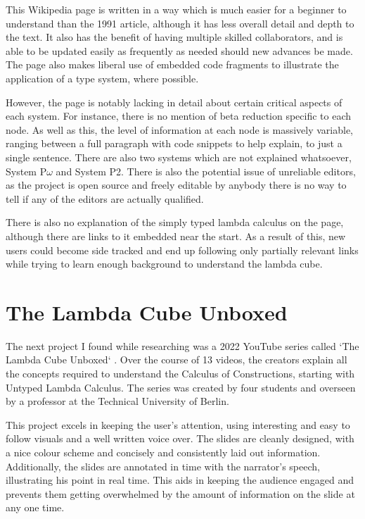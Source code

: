 \documentclass{l4proj}
\begin{document}
This Wikipedia page is written in a way which is much easier for a beginner to understand than the 1991 article, although it has less overall detail and depth to the text.  It also has the benefit of having multiple skilled collaborators, and is able to be updated easily as frequently as needed should new advances be made.  The page also makes liberal use of embedded code fragments to illustrate the application of a type system, where possible.

However, the page is notably lacking in detail about certain critical aspects of each system.  For instance, there is no mention of beta reduction specific to each node.  As well as this, the level of information at each node is massively variable, ranging between a full paragraph with code snippets to help explain, to just a single sentence.  There are also two systems which are not explained whatsoever, System P\underline{$\omega$} and System P2.  There is also the potential issue of unreliable editors, as the project is open source and freely editable by anybody there is no way to tell if any of the editors are actually qualified.

There is also no explanation of the simply typed lambda calculus on the page, although there are links to it embedded near the start.  As a result of this, new users could become side tracked and end up following only partially relevant links while trying to learn enough background to understand the lambda cube.

\section{The Lambda Cube Unboxed}

The next project I found while researching was a 2022 YouTube series called `The Lambda Cube Unboxed` \cite{youtube}.  Over the course of 13 videos, the creators explain all the concepts required to understand the Calculus of Constructions, starting with Untyped Lambda Calculus.  The series was created by four students and overseen by a professor at the Technical University of Berlin.

This project excels in keeping the user's attention, using interesting and easy to follow visuals and a well written voice over.  The slides are cleanly designed, with a nice colour scheme and concisely and consistently laid out information.  Additionally, the slides are annotated in time with the narrator's speech, illustrating his point in real time.  This aids in keeping the audience engaged and prevents them getting overwhelmed by the amount of information on the slide at any one time.
\end{document}
